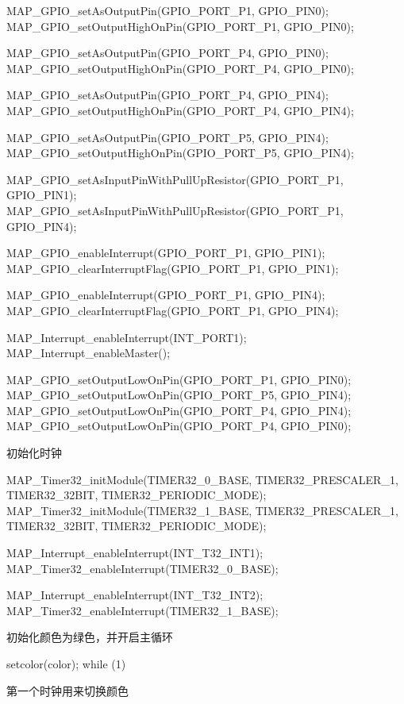 \documentclass[a4paper,10pt,UTF8]{paper}
\numberwithin{equation}{section}
\numberwithin{figure}{section}
\begin{document}
\begin{ccode}
    MAP_GPIO_setAsOutputPin(GPIO_PORT_P1, GPIO_PIN0);
    MAP_GPIO_setOutputHighOnPin(GPIO_PORT_P1, GPIO_PIN0);

    MAP_GPIO_setAsOutputPin(GPIO_PORT_P4, GPIO_PIN0);
    MAP_GPIO_setOutputHighOnPin(GPIO_PORT_P4, GPIO_PIN0);

    MAP_GPIO_setAsOutputPin(GPIO_PORT_P4, GPIO_PIN4);
    MAP_GPIO_setOutputHighOnPin(GPIO_PORT_P4, GPIO_PIN4);

    MAP_GPIO_setAsOutputPin(GPIO_PORT_P5, GPIO_PIN4);
    MAP_GPIO_setOutputHighOnPin(GPIO_PORT_P5, GPIO_PIN4);
    
    MAP_GPIO_setAsInputPinWithPullUpResistor(GPIO_PORT_P1, GPIO_PIN1);
    MAP_GPIO_setAsInputPinWithPullUpResistor(GPIO_PORT_P1, GPIO_PIN4);

    MAP_GPIO_enableInterrupt(GPIO_PORT_P1, GPIO_PIN1);
    MAP_GPIO_clearInterruptFlag(GPIO_PORT_P1, GPIO_PIN1);

    MAP_GPIO_enableInterrupt(GPIO_PORT_P1, GPIO_PIN4);
    MAP_GPIO_clearInterruptFlag(GPIO_PORT_P1, GPIO_PIN4);

    MAP_Interrupt_enableInterrupt(INT_PORT1);
    MAP_Interrupt_enableMaster();

    MAP_GPIO_setOutputLowOnPin(GPIO_PORT_P1, GPIO_PIN0);
    MAP_GPIO_setOutputLowOnPin(GPIO_PORT_P5, GPIO_PIN4);
    MAP_GPIO_setOutputLowOnPin(GPIO_PORT_P4, GPIO_PIN4);
    MAP_GPIO_setOutputLowOnPin(GPIO_PORT_P4, GPIO_PIN0);
\end{ccode}

初始化时钟

\begin{ccode}
    MAP_Timer32_initModule(TIMER32_0_BASE, TIMER32_PRESCALER_1,
     TIMER32_32BIT, TIMER32_PERIODIC_MODE);
    MAP_Timer32_initModule(TIMER32_1_BASE, TIMER32_PRESCALER_1,
     TIMER32_32BIT, TIMER32_PERIODIC_MODE);

    MAP_Interrupt_enableInterrupt(INT_T32_INT1);
    MAP_Timer32_enableInterrupt(TIMER32_0_BASE);

    MAP_Interrupt_enableInterrupt(INT_T32_INT2);
    MAP_Timer32_enableInterrupt(TIMER32_1_BASE);
\end{ccode}

初始化颜色为绿色，并开启主循环

\begin{ccode}
    setcolor(color);
    while (1)
    {
    }
\end{ccode}

第一个时钟用来切换颜色
\end{document}

